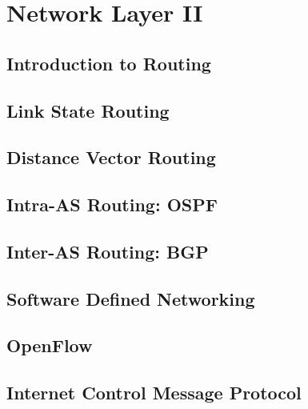 \section{Network Layer II}
\subsection{Introduction to Routing}

\newpage

\subsection{Link State Routing}

\subsection{Distance Vector Routing}

\subsection{Intra-AS Routing: OSPF}

\subsection{Inter-AS Routing: BGP}

\subsection{Software Defined Networking}

\subsection{OpenFlow}

\subsection{Internet Control Message Protocol}